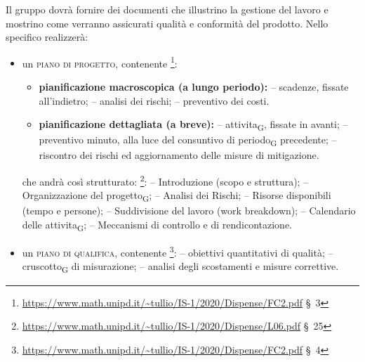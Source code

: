 
        \label{pianificazione}
            Il gruppo dovrà fornire dei documenti che illustrino la gestione del lavoro e mostrino come verranno assicurati qualità e conformità del prodotto. Nello specifico realizzerà:
            \begin{itemize}
                \item un \textsc{piano di progetto}, contenente \footnote{\url{https://www.math.unipd.it/~tullio/IS-1/2020/Dispense/FC2.pdf} \S\ 3}:
                    \begin{itemize}
                        \item \textbf{pianificazione macroscopica (a lungo periodo):}
                            \subitem -- scadenze, fissate all'indietro;
                            \subitem -- analisi dei rischi;
                            \subitem -- preventivo dei costi.
                        \item \textbf{pianificazione dettagliata (a breve):}
                            \subitem -- \gls{attivita}\textsubscript{G}, fissate in avanti;
                            \subitem -- preventivo minuto, alla luce del consuntivo di \gls{periodo}\textsubscript{G} precedente;
                            \subitem -- riscontro dei rischi ed aggiornamento delle misure di mitigazione.
                    \end{itemize}

                    che andrà così strutturato: \footnote{\url{https://www.math.unipd.it/~tullio/IS-1/2020/Dispense/L06.pdf} \S\ 25}:
                    \subitem -- Introduzione (scopo e struttura);
                    \subitem -- Organizzazione del \gls{progetto}\textsubscript{G};
                    \subitem -- Analisi dei Rischi;
                    \subitem -- Risorse disponibili (tempo e persone);
                    \subitem -- Suddivisione del lavoro (work breakdown);
                    \subitem -- Calendario delle \gls{attivita}\textsubscript{G};
                    \subitem -- Meccanismi di controllo e di rendicontazione.

                \item un \textsc{piano di qualifica}, contenente \footnote{\url{https://www.math.unipd.it/~tullio/IS-1/2020/Dispense/FC2.pdf} \S\ 4}:
                    \subitem -- obiettivi quantitativi di qualità;
                    \subitem -- \gls{cruscotto}\textsubscript{G} di misurazione;
                    \subitem -- analisi degli scostamenti e misure correttive.
            \end{itemize}

